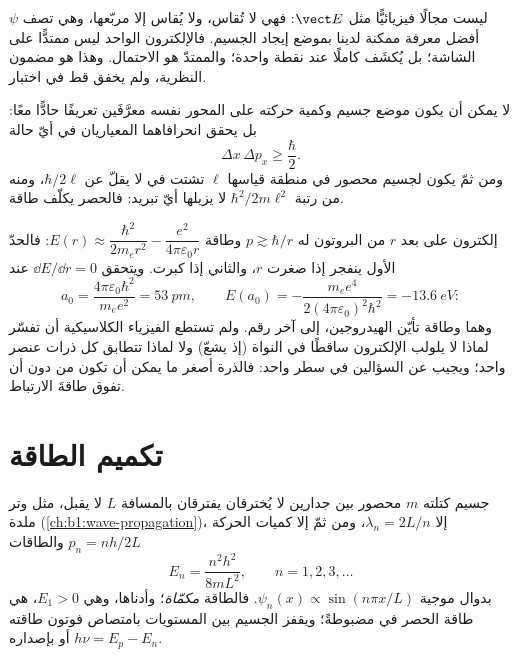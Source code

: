 \begin{remark}\label{rem:b1:quantum-introduction:whatwaves}
$\psi$ ليست مجالًا فيزيائيًّا مثل $\vect E$: فهي لا تُقاس، ولا يُقاس إلا
مربّعها، وهي تصف أفضل معرفة ممكنة لدينا بموضع
إيجاد الجسيم. فالإلكترون الواحد ليس ممتدًّا على
الشاشة؛ بل يُكشَف كاملًا عند نقطة واحدة؛ والممتدّ هو
الاحتمال. وهذا هو مضمون النظرية، ولم يخفق قط
في اختبار.
\end{remark}

\begin{theorem}\label{thm:b1:quantum-introduction:heisenberg}
لا يمكن أن يكون موضع جسيم وكمية حركته على المحور نفسه
معرَّفَين تعريفًا حادًّا معًا: بل يحقق انحرافاهما المعياريان في أيّ حالة
\[
\Delta x\,\Delta p_x \geq \frac{\hbar}{2} .
\]
ومن ثمّ يكون لجسيم محصور في منطقة قياسها $\ell$ تشتت في  لا يقلّ عن $\hbar/2\ell$، ومنه  من رتبة
$\hbar^2/2m\ell^2$ لا يزيلها أيّ تبريد: فالحصر يكلّف طاقة.
\end{theorem}
\admitted

\begin{example}\label{ex:b1:quantum-introduction:hsize}
إلكترون على بعد $r$ من البروتون له $p \gtrsim \hbar/r$ وطاقة
$E(r) \approx \dfrac{\hbar^2}{2m_er^2} - \dfrac{e^2}{4\pi\varepsilon_0r}$: فالحدّ الأول
ينفجر إذا صغرت $r$، والثاني إذا كبرت. ويتحقق $\dd E/\dd r = 0$ عند
\[
a_0 = \frac{4\pi\varepsilon_0\hbar^2}{m_ee^2} = \qty{53}{pm} , \qquad
E(a_0) = -\frac{m_ee^4}{2(4\pi\varepsilon_0)^2\hbar^2} = \qty{-13.6}{eV} :
\]
وهما \emph{} وطاقة تأيّن الهيدروجين، إلى
آخر رقم. ولم تستطع الفيزياء الكلاسيكية أن تفسّر لماذا لا يلولب الإلكترون
ساقطًا في النواة (إذ يشعّ) ولا لماذا تتطابق كل ذرات
عنصر واحد؛ ويجيب  عن السؤالين في سطر
واحد: فالذرة أصغر ما يمكن أن تكون من دون أن تفوق 
طاقةَ الارتباط.
\end{example}

\section{تكميم الطاقة}

\begin{proposition}\label{prop:b1:quantum-introduction:box}
جسيم كتلته $m$ محصور بين جدارين لا يُخترقان يفترقان
بالمسافة $L$ لا يقبل، مثل وتر ملدة
(\cref{ch:b1:wave-propagation})، إلا  $\lambda_n = 2L/n$،
ومن ثمّ إلا كميات الحركة $p_n = nh/2L$ والطاقات
\[
E_n = \frac{n^2h^2}{8mL^2} , \qquad n = 1, 2, 3, \ldots
\]
بدوال موجية $\psi_n(x) \propto \sin(n\pi x/L)$. فالطاقة
\emph{مكمّاة}؛ وأدناها، وهي \emph{} $E_1 > 0$، هي
طاقة الحصر في  مضبوطةً؛ ويقفز
الجسيم بين المستويات بامتصاص فوتون طاقته $h\nu = E_p - E_n$ أو
بإصداره.
\end{proposition}

